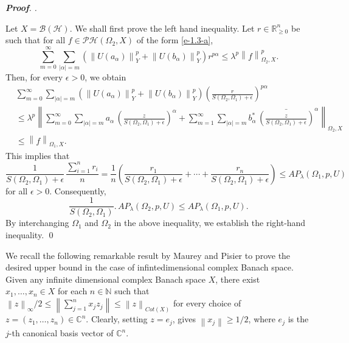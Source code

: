 \documentclass[a4paper,11pt, reqno]{amsart}
\theoremstyle{definition}
\newenvironment{customthm}[1]
{\renewcommand\theinnercustomthm{#1}\innercustomthm}
{\endinnercustomthm}
\newenvironment{pf}[1][]{%
	\vskip 3mm
	\noindent
	\ifthenelse{\equal{#1}{}}%
	{{\slshape {\bf Proof}. }}%
	{{\slshape #1.} }%
}%
{\qed\bigskip}
\newcommand{\norm}[1]{\left\lVert#1\right\rVert}
\begin{document}
\begin{pf}
Let $X=\mathcal{B}(\mathcal{H})$. We shall first prove the left hand inequality. Let $r\in \mathbb{R}^n_{\geq 0}$ be such that for all $f \in \mathcal{PH}(\Omega_2,X)$ of the form \eqref{e-1.3-a},
\begin{equation} \label{ee-1.8-atm-added}
	\sum_{m=0}^{\infty}	\sum_{|\alpha|=m} (\norm{U(a_{\alpha})}^p_{Y} + \norm{U(b_{\alpha})}^p_{Y})r^{p \alpha} \leq \lambda^{p} \norm{f}^p_{\Omega_2, X}.	
\end{equation}
Then, for every $\epsilon >0$, we obtain
\begin{align*}
&\sum_{m=0}^{\infty}	\sum_{|\alpha|=m} (\norm{U(a_{\alpha})}^p_{Y} + \norm{U(b_{\alpha})}^p_{Y}) \left(\frac{r}{S(\Omega_{2},\Omega_{1}) +\epsilon}\right)^{p \alpha} \\
& \leq \lambda^p \norm{\sum_{m=0}^{\infty} \sum_{|\alpha|=m} a_{\alpha}\, \left(\frac{z}{S(\Omega_{2},\Omega_{1}) +\epsilon}\right)^{\alpha} + \sum_{m=1}^{\infty} \sum_{|\alpha|=m} b^{*}_{\alpha}\, \bar{\left(\frac{z}{S(\Omega_{2},\Omega_{1}) +\epsilon}\right)}^{\alpha}}_{\Omega_2,X} \\
& \leq \norm{f}_{\Omega_{1},X}.
\end{align*} 
This implies that
\begin{equation*}
\frac{1}{S(\Omega_{2},\Omega_{1}) +\epsilon} \, \frac{\sum_{i=1}^{n} r_i}{n}=\frac{1}{n}\left(\frac{r_1}{S(\Omega_{2},\Omega_{1}) +\epsilon} +\cdots + \frac{r_n}{S(\Omega_{2},\Omega_{1}) +\epsilon}\right) \leq AP_{\lambda}(\Omega_{1}, p,U)
\end{equation*}
for all $\epsilon>0$.
Consequently, 
\begin{equation*}
\frac{1}{S(\Omega_{2},\Omega_{1})}.\, AP_{\lambda}(\Omega_{2}, p,U) \leq  AP_{\lambda}(\Omega_{1}, p,U). 
\end{equation*}
By interchanging $\Omega_{1}$ and $\Omega_{2}$ in the above inequality, we establish the right-hand inequality.
\end{pf}

	We recall the following remarkable result by Maurey and Pisier to prove the desired upper bound in the case of infintedimensional complex Banach space. 
	\begin{customthm}{A} \cite[Theorem 14.5]{diestel-abs-summing-1995} \label{thm-A}
		Given any infinite dimensional complex Banach space $X$, there exist $x_{1}, \ldots , x_{n} \in X$ for each $n \in \mathbb{N}$ such that $\norm{z}_{\infty}/2 \leq \norm{\sum_{j=1}^{n} x_{j}z_{j}} \leq \norm{z}_{Cot(X)}$  for every choice of $z=(z_{1}, \ldots,z_{n}) \in \mathbb{C}^n$. Clearly, setting $z=e_{j}$, gives $\norm{x_{j}}\geq 1/2$, where $e_{j}$ is the $j$-th canonical basis vector of $\mathbb{C}^n$.
	\end{customthm}
\end{document}

